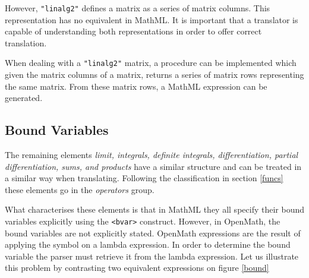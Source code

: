 However, \verb|"linalg2"| defines a matrix as a series of matrix
columns. This representation has no equivalent in MathML. It is
important that a translator is capable of understanding both
representations in order to offer correct translation.

When dealing with a \verb|"linalg2"| matrix, a procedure can be
implemented which given the matrix columns of a matrix, returns a
series of matrix rows representing the same matrix. From these matrix
rows, a MathML expression can be generated.

\subsection{Bound Variables} \label{boundvars}

The remaining elements {\it limit, integrals, definite integrals,
differentiation, partial differentiation, sums, and products} have a
similar structure and can be treated in a similar way when translating.  
Following the classification in section \ref{funcs} these elements go
in the {\it operators} group.

What characterises these elements is that in MathML they all specify
their bound variables explicitly using the \verb|<bvar>| construct.
However, in OpenMath, the bound variables are not explicitly stated.
OpenMath expressions are the result of applying the symbol on a lambda
expression. In order to determine the bound variable the parser must
retrieve it from the lambda expression. Let us illustrate this problem
by contrasting two equivalent expressions on figure \ref{bound}



